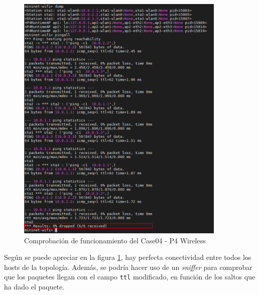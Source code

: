 \begin{figure}[ht]
    \centering
    \includegraphics[width=10cm]{archivos/img/dev/p4-wifi/case04/demo_case04_edited.png}
    \caption{Comprobación de funcionamiento del Case04 - P4 Wireless}
    \label{fig:case04_p4_wifi_func1}
\end{figure}


Según se puede apreciar en la figura \ref{fig:case04_p4_wifi_func1}, hay perfecta conectividad entre todos los hosts de la topología. Además, se podría hacer uso de un \textit{sniffer} para comprobar que los paquetes llegan con el campo \texttt{ttl} modificado, en función de los saltos que ha dado el paquete. 